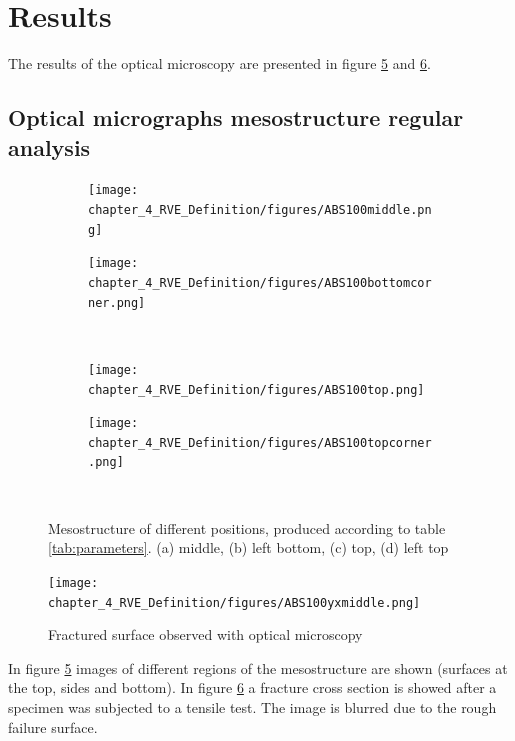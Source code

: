 \section{Results}
The results of the optical microscopy are presented in figure \ref{fig:Mesoresults} and \ref{fig:ABS100yxmiddle}. 

\subsection{Optical micrographs mesostructure regular analysis}

\begin{figure}[H]
\centering
  \begin{subfigure}[b]{0.48\textwidth}
  \centering
    \texttt{[image: chapter\_4\_RVE\_Definition/figures/ABS100middle.png]}
    \caption{}
    \label{fig:Mesoresults_a}
  \end{subfigure}
  \begin{subfigure}[b]{0.48\textwidth}
    \texttt{[image: chapter\_4\_RVE\_Definition/figures/ABS100bottomcorner.png]}
    \caption{}
    \label{fig:Mesoresults_b}
  \end{subfigure}
  \\
    \begin{subfigure}[b]{0.48\textwidth}
    \texttt{[image: chapter\_4\_RVE\_Definition/figures/ABS100top.png]}
    \caption{}
    \label{fig:Mesoresults_c}
  \end{subfigure}
  \begin{subfigure}[b]{0.48\textwidth}
    \texttt{[image: chapter\_4\_RVE\_Definition/figures/ABS100topcorner.png]}
    \caption{}
    \label{fig:Mesoresults_d}
  \end{subfigure}
  \\
  \caption{Mesostructure of different positions, produced according to table \ref{tab:parameters}. (a) middle, (b) left bottom, (c) top, (d) left top}
    \label{fig:Mesoresults}
\end{figure}

\begin{figure}[H]
    \centering
    \texttt{[image: chapter\_4\_RVE\_Definition/figures/ABS100yxmiddle.png]}
    \caption{Fractured surface observed with optical microscopy}
    \label{fig:ABS100yxmiddle}
\end{figure}

In figure \ref{fig:Mesoresults} images of different regions of the mesostructure are shown (surfaces at the top, sides and bottom).  In figure \ref{fig:ABS100yxmiddle} a fracture cross section is showed after a specimen was subjected to a tensile test. The image is blurred due to the rough failure surface.

